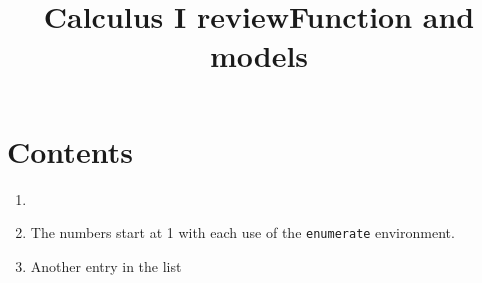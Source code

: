 \title{Calculus I review}

\section*{Contents}
\begin{enumerate}
    \item \title{Function and models}
    \item The numbers start at 1 with each use of the \texttt{enumerate} environment.
    \item Another entry in the list
  \end{enumerate}




